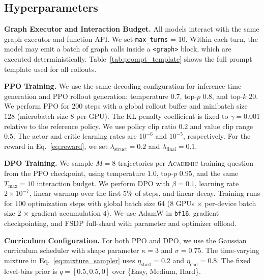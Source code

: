 \documentclass[11pt]{article}
\begin{document}
\subsection{Hyperparameters}
\label{app:hyperparameters}

\noindent \textbf{Graph Executor and Interaction Budget.}
All models interact with the same graph executor and function API.
We set \texttt{max\_turns} = 10. Within each turn, the model may emit a batch of graph calls inside a \texttt{<graph>} block, which are executed deterministically.
Table~\ref{tab:prompt_template} shows the full prompt template used for all rollouts.

\smallskip
\noindent \textbf{PPO Training.}
We use the same decoding configuration for inference-time generation and PPO rollout generation: temperature $0.7$, top-$p$ $0.8$, and top-$k$ $20$.
We perform PPO for $200$ steps with a global rollout buffer and minibatch size $128$ (microbatch size $8$ per GPU).
The KL penalty coefficient is fixed to $\gamma=0.001$ relative to the reference policy.
We use policy clip ratio $0.2$ and value clip range $0.5$.
The actor and critic learning rates are $10^{-6}$ and $10^{-5}$, respectively.
For the reward in Eq.~\ref{eq:reward}, we set $\lambda_{\text{struct}} = 0.2$ and $\lambda_{\text{final}} = 0.1$.

\smallskip
\noindent \textbf{DPO Training.}
We sample $M=8$ trajectories per \textsc{Academic} training question from the PPO checkpoint, using temperature $1.0$, top-$p$ $0.95$, and the same $T_{\max}=10$ interaction budget.
We perform DPO with $\beta=0.1$, learning rate $2\times10^{-7}$, linear warmup over the first $5\%$ of steps, and linear decay.
Training runs for $100$ optimization steps with global batch size $64$ ($8$ GPUs $\times$ per-device batch size $2$ $\times$ gradient accumulation $4$).
We use AdamW in \texttt{bf16}, gradient checkpointing, and FSDP full-shard with parameter and optimizer offload.

\smallskip
\noindent \textbf{Curriculum Configuration.}
For both PPO and DPO, we use the Gaussian curriculum scheduler with shape parameter $\kappa=3$ and $\sigma=0.75$.
The time-varying mixture in Eq.~\ref{eq:mixture_sampler} uses $\eta_{\text{start}}=0.2$ and $\eta_{\text{end}}=0.8$.
The fixed level-bias prior is $q=[0.5,0.5,0]$ over \{Easy, Medium, Hard\}.

\iffalse
\end{document}
